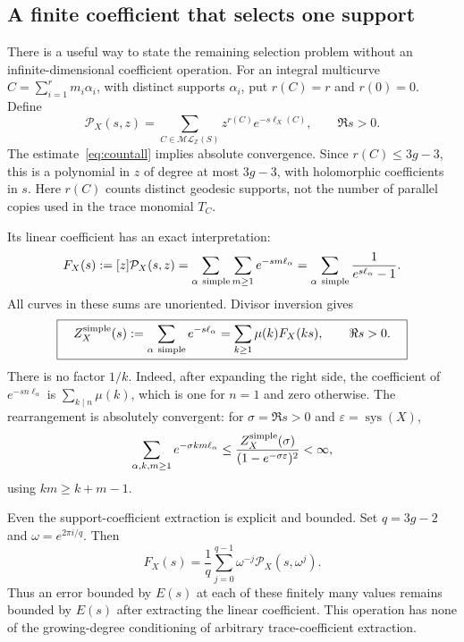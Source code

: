 \documentclass[11pt,a4paper]{article}
\numberwithin{equation}{section}
\theoremstyle{definition}
\theoremstyle{remark}
\newcommand{\ZZ}{\mathbb Z}
\begin{document}
\subsection{A finite coefficient that selects one support}
\label{subsec:countsupport}

There is a useful way to state the remaining selection problem without
an infinite-dimensional coefficient operation. For an integral
multicurve $C=\sum_{i=1}^r m_i\alpha_i$, with distinct supports
$\alpha_i$, put $r(C)=r$ and $r(0)=0$. Define
\begin{equation}
 \mathcal P_X(s,z)=\sum_{C\in\mathcal{ML}_{\ZZ}(S)}
       z^{r(C)}e^{-s\ell_X(C)},\qquad \Re s>0.
 \label{eq:countsupportpartition}
\end{equation}
The estimate~\eqref{eq:countall} implies absolute
convergence. Since $r(C)\leq3g-3$, this is a polynomial in $z$ of
degree at most $3g-3$, with holomorphic coefficients in $s$.
Here $r(C)$ counts distinct geodesic supports, not the number of
parallel copies used in the trace monomial $T_C$.

Its linear coefficient has an exact interpretation:
\begin{equation}
 F_X(s):=[z]\mathcal P_X(s,z)
 =\sum_{\alpha\ {\rm simple}}\sum_{m\geq1}e^{-sm\ell_\alpha}
 =\sum_{\alpha\ {\rm simple}}\frac{1}{e^{s\ell_\alpha}-1}.
 \label{eq:countonesupport}
\end{equation}
All curves in these sums are unoriented. Divisor inversion gives
\begin{equation}
 \boxed{\quad
 Z_X^{\rm simple}(s):=\sum_{\alpha\ {\rm simple}}e^{-s\ell_\alpha}
 =\sum_{k\geq1}\mu(k)F_X(ks),\qquad \Re s>0.
 \quad}
 \label{eq:countsupportmobius}
\end{equation}
There is no factor $1/k$. Indeed, after expanding the right side,
the coefficient of $e^{-sn\ell_\alpha}$ is
$\sum_{k\mid n}\mu(k)$, which is one for $n=1$ and zero otherwise.
The rearrangement is absolutely convergent: for
$\sigma=\Re s>0$ and $\varepsilon=\operatorname{sys}(X)$,
\[
 \sum_{\alpha,k,m\geq1}e^{-\sigma km\ell_\alpha}
 \leq\frac{Z_X^{\rm simple}(\sigma)}
               {(1-e^{-\sigma\varepsilon})^2}<\infty,
\]
using $km\geq k+m-1$.

Even the support-coefficient extraction is explicit and bounded.
Set $q=3g-2$ and $\omega=e^{2\pi i/q}$. Then
\begin{equation}
 F_X(s)=\frac1q\sum_{j=0}^{q-1}
                 \omega^{-j}\mathcal P_X(s,\omega^j).
 \label{eq:countsupportfourier}
\end{equation}
Thus an error bounded by $E(s)$ at each of these finitely many
values remains bounded by $E(s)$ after extracting the linear
coefficient. This operation has none of the growing-degree
conditioning of arbitrary trace-coefficient extraction.
\end{document}

